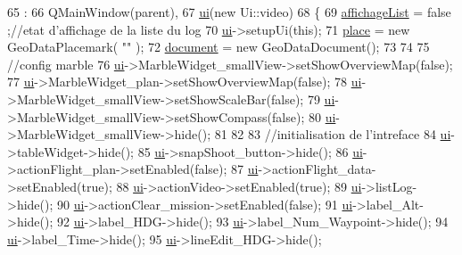 \begin{DoxyCode}
65                             :
66     QMainWindow(parent),
67     \hyperlink{a00015_a4f4e978b71511ee6fcb91ef1a4e3c17c}{ui}(\textcolor{keyword}{new} Ui::video)
68 \{
69     \hyperlink{a00042_aef1d7c2fea653fb1d729b2f40b2c2c53}{affichageList} = false ;\textcolor{comment}{//etat d'affichage de la liste du log}
70     \hyperlink{a00015_a4f4e978b71511ee6fcb91ef1a4e3c17c}{ui}->setupUi(\textcolor{keyword}{this});
71     \hyperlink{a00042_ab78e87803316b7303d0f8697c7c0f253}{place} =  \textcolor{keyword}{new} GeoDataPlacemark( \textcolor{stringliteral}{""} );
72     \hyperlink{a00042_a8b0f68f97ddd8c30ad31efa6919778ee}{document} = \textcolor{keyword}{new} GeoDataDocument();
73 
74 
75     \textcolor{comment}{//config marble}
76     \hyperlink{a00015_a4f4e978b71511ee6fcb91ef1a4e3c17c}{ui}->MarbleWidget\_smallView->setShowOverviewMap(\textcolor{keyword}{false});
77     \hyperlink{a00015_a4f4e978b71511ee6fcb91ef1a4e3c17c}{ui}->MarbleWidget\_plan->setShowOverviewMap(\textcolor{keyword}{false});
78     \hyperlink{a00015_a4f4e978b71511ee6fcb91ef1a4e3c17c}{ui}->MarbleWidget\_smallView->setShowScaleBar(\textcolor{keyword}{false});
79     \hyperlink{a00015_a4f4e978b71511ee6fcb91ef1a4e3c17c}{ui}->MarbleWidget\_smallView->setShowCompass(\textcolor{keyword}{false});
80     \hyperlink{a00015_a4f4e978b71511ee6fcb91ef1a4e3c17c}{ui}->MarbleWidget\_smallView->hide();
81 
82 
83     \textcolor{comment}{//initialisation de l'intreface}
84     \hyperlink{a00015_a4f4e978b71511ee6fcb91ef1a4e3c17c}{ui}->tableWidget->hide();
85     \hyperlink{a00015_a4f4e978b71511ee6fcb91ef1a4e3c17c}{ui}->snapShoot\_button->hide();
86     \hyperlink{a00015_a4f4e978b71511ee6fcb91ef1a4e3c17c}{ui}->actionFlight\_plan->setEnabled(\textcolor{keyword}{false});
87     \hyperlink{a00015_a4f4e978b71511ee6fcb91ef1a4e3c17c}{ui}->actionFlight\_data->setEnabled(\textcolor{keyword}{true});
88     \hyperlink{a00015_a4f4e978b71511ee6fcb91ef1a4e3c17c}{ui}->actionVideo->setEnabled(\textcolor{keyword}{true});
89     \hyperlink{a00015_a4f4e978b71511ee6fcb91ef1a4e3c17c}{ui}->listLog->hide();
90     \hyperlink{a00015_a4f4e978b71511ee6fcb91ef1a4e3c17c}{ui}->actionClear\_mission->setEnabled(\textcolor{keyword}{false});
91     \hyperlink{a00015_a4f4e978b71511ee6fcb91ef1a4e3c17c}{ui}->label\_Alt->hide();
92     \hyperlink{a00015_a4f4e978b71511ee6fcb91ef1a4e3c17c}{ui}->label\_HDG->hide();
93     \hyperlink{a00015_a4f4e978b71511ee6fcb91ef1a4e3c17c}{ui}->label\_Num\_Waypoint->hide();
94     \hyperlink{a00015_a4f4e978b71511ee6fcb91ef1a4e3c17c}{ui}->label\_Time->hide();
95     \hyperlink{a00015_a4f4e978b71511ee6fcb91ef1a4e3c17c}{ui}->lineEdit\_HDG->hide();

\end{DoxyCode}

